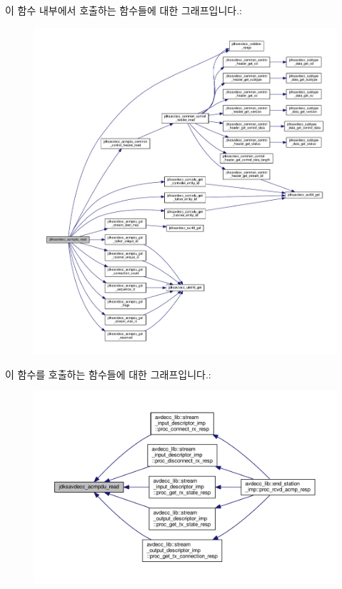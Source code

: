 이 함수 내부에서 호출하는 함수들에 대한 그래프입니다.\+:
\nopagebreak
\begin{figure}[H]
\begin{center}
\leavevmode
\includegraphics[width=350pt]{group__acmpdu_gaf49dbf727e31865dd891330cbdeeabc2_cgraph}
\end{center}
\end{figure}




이 함수를 호출하는 함수들에 대한 그래프입니다.\+:
\nopagebreak
\begin{figure}[H]
\begin{center}
\leavevmode
\includegraphics[width=350pt]{group__acmpdu_gaf49dbf727e31865dd891330cbdeeabc2_icgraph}
\end{center}
\end{figure}


